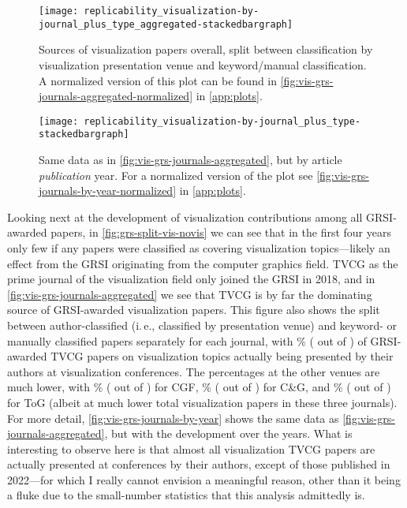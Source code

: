 \documentclass[conference,svgnames]{vgtc}                     %
\newcommand{\ie}{i.\,e.}
\begin{document}
\begin{figure}
	\centering
	\texttt{[image: replicability\_visualization-by-journal\_plus\_type\_aggregated-stackedbargraph]}
	\caption{Sources of visualization papers overall, split between classification by visualization presentation venue and keyword/manual classification. A normalized version of this plot can be found in \autoref{fig:vis-grs-journals-aggregated-normalized} in \autoref{app:plots}.}
	\label{fig:vis-grs-journals-aggregated}
\end{figure}

\begin{figure}
	\centering
	\texttt{[image: replicability\_visualization-by-journal\_plus\_type-stackedbargraph]}
	\caption{Same data as in \autoref{fig:vis-grs-journals-aggregated}, but by article \emph{publication} year. For a normalized version of the plot see \autoref{fig:vis-grs-journals-by-year-normalized} in \autoref{app:plots}.}
	\label{fig:vis-grs-journals-by-year}
\end{figure}

Looking next at the development of visualization contributions among all GRSI-awarded papers, in \autoref{fig:grs-split-vis-novis} we can see that in the first four years only few if any papers were classified as covering visualization topics---likely an effect from the GRSI originating from the computer graphics field. TVCG as the prime journal of the visualization field only joined the GRSI in 2018, and in \autoref{fig:vis-grs-journals-aggregated} we see that TVCG is by far the dominating source of GRSI-awarded visualization papers. This figure also shows the split between author-classified (\ie, classified by presentation venue) and keyword- or manually classified papers separately for each journal, with \GrsiVisPapersInIEEETVCGPercentagePresentation{}\% (\GrsiVisPapersInIEEETVCGPresentation{} out of \GrsiVisPapersInIEEETVCGTotal) of GRSI-awarded TVCG papers on visualization topics actually being presented by their authors at visualization conferences. The percentages at the other venues are much lower, with \GrsiVisPapersInWileyCGFPercentagePresentation{}\% (\GrsiVisPapersInWileyCGFPresentation{} out of \GrsiVisPapersInWileyCGFTotal) for CGF, \GrsiVisPapersInElsevierCaGPercentagePresentation{}\% (\GrsiVisPapersInElsevierCaGPresentation{} out of \GrsiVisPapersInElsevierCaGTotal) for C\&G, and \GrsiVisPapersInACMToGPercentagePresentation{}\% (\GrsiVisPapersInACMToGPresentation{} out of \GrsiVisPapersInACMToGTotal) for ToG (albeit at much lower total visualization papers in these three journals). For more detail, \autoref{fig:vis-grs-journals-by-year} shows the same data as \autoref{fig:vis-grs-journals-aggregated}, but with the development over the years. What is interesting to observe here is that almost all visualization TVCG papers are actually presented at conferences by their authors, except of those published in 2022---for which I really cannot envision a meaningful reason, other than it being a fluke due to the small-number statistics that this analysis admittedly is.
\end{document}
